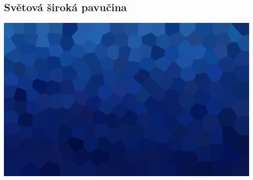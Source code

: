 \documentclass[aspectratio=169,xcolor=dvipsnames, t]{beamer}
\begin{document}
\subsection{Světová široká pavučina}
{
    \includegraphics[width=\paperwidth,height=\paperheight]{AICStyleData/logos/mene_polygonu_bg.png}
}
\end{document}
